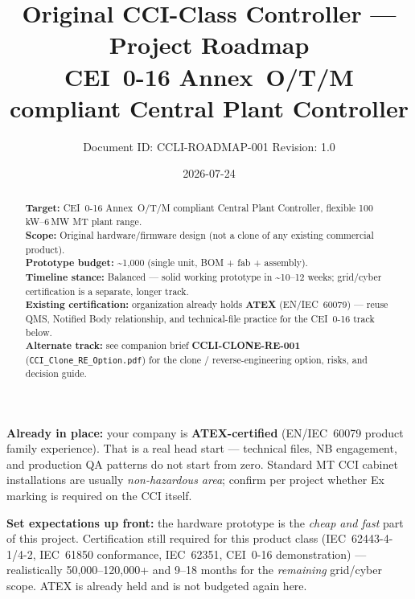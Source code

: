 \documentclass[11pt,a4paper]{article}
\title{%
  \textbf{Original CCI-Class Controller --- Project Roadmap}\\[0.4em]
  \large CEI~0-16 Annex~O/T/M compliant Central Plant Controller
}
\author{Document ID: CCLI-ROADMAP-001 \quad Revision: 1.0}
\date{2026-07-24}
\newcommand{\file}[1]{\texttt{#1}}
\newcommand{\docref}[1]{\textbf{#1}}
\begin{document}
\maketitle
\thispagestyle{empty}

\begin{abstract}
\noindent
\textbf{Target:} CEI~0-16 Annex~O/T/M compliant Central Plant Controller, flexible 100\,kW--6\,MW MT plant range.\\
\textbf{Scope:} Original hardware/firmware design (not a clone of any existing commercial product).\\
\textbf{Prototype budget:} \textasciitilde{}\EUR{}1{,}000 (single unit, BOM + fab + assembly).\\
\textbf{Timeline stance:} Balanced --- solid working prototype in \textasciitilde{}10--12 weeks; grid/cyber certification is a separate, longer track.\\
\textbf{Existing certification:} organization already holds \textbf{ATEX} (EN/IEC~60079) --- reuse QMS, Notified Body relationship, and technical-file practice for the CEI~0-16 track below.\\
\textbf{Alternate track:} see companion brief \docref{CCLI-CLONE-RE-001} (\file{CCI\_Clone\_RE\_Option.pdf}) for the clone / reverse-engineering option, risks, and decision guide.
\end{abstract}

\begin{center}
\begin{minipage}{0.95\linewidth}
\colorbox{okbg}{%
  \parbox{\dimexpr\linewidth-2\fboxsep\relax}{%
    \small
    \textbf{\textcolor{okgreen}{Already in place:}}
    your company is \textbf{ATEX-certified} (EN/IEC~60079 product family experience).
    That is a real head start --- technical files, NB engagement, and production QA patterns do not start from zero.
    Standard MT CCI cabinet installations are usually \emph{non-hazardous area}; confirm per project whether Ex marking is required on the CCI itself.
  }%
}
\end{minipage}
\end{center}

\vspace{0.5em}
\begin{center}
\begin{minipage}{0.95\linewidth}
\colorbox{warnbg}{%
  \parbox{\dimexpr\linewidth-2\fboxsep\relax}{%
    \small
    \textbf{\textcolor{warnamber}{Set expectations up front:}}
    the hardware prototype is the \emph{cheap and fast} part of this project.
    Certification still required for this product class (IEC~62443-4-1/4-2, IEC~61850 conformance, IEC~62351, CEI~0-16 demonstration) ---
    realistically \EUR{}50{,}000--120{,}000+ and 9--18 months for the \emph{remaining} grid/cyber scope.
    ATEX is already held and is not budgeted again here.
  }%
}
\end{minipage}
\end{center}
\end{document}
